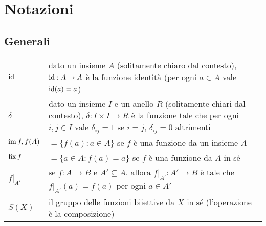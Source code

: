 \renewcommand{\arraystretch}{1.5}

\chapter{Notazioni}
\section{Generali}
\begin{tabularx}{\textwidth}{SX}
\hline
$\operatorname{id}$ & dato un insieme $A$ (solitamente chiaro dal contesto), $\operatorname{id}:A\to A$ è la funzione identità (per ogni $a\in A$ vale $\operatorname{id}(a)=a$)\\
$\delta$ & dato un insieme $I$ e un anello $R$ (solitamente chiari dal contesto), $\delta:I\times I\to R$ è la funzione tale che per ogni $i,j\in I$ vale $\delta_{ij}=1$ se $i=j$, $\delta_{ij}=0$ altrimenti \\
$\operatorname{im} f,f(A)$ & $=\{f(a):a\in A\}$ se $f$ è una funzione da un insieme $A$\\
$\operatorname{fix} f$ & $=\{a\in A:f(a)=a\}$ se $f$ è una funzione da $A$ in sé\\
$f|_{A'}$ & se $f:A\to B$ e $A'\subseteq A$, allora $f|_{A'}:A'\to B$ è tale che $f|_{A'}(a)=f(a)$ per ogni $a\in A'$\\
$S(X)$ & il gruppo delle funzioni biiettive da $X$ in sé (l'operazione è la composizione)\\
\hline
\end{tabularx}
